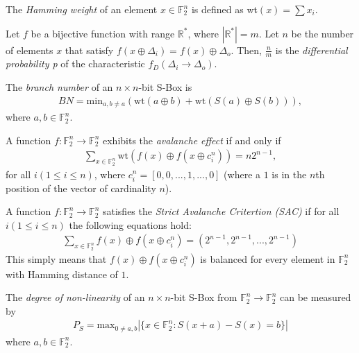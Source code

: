 \documentclass[11pt]{article}
\newcommand{\field}[1]{\mathbb{#1}} %
\begin{document}

\begin{define}
The \emph{Hamming weight} of an element $x \in \field{F}_2^n$ is defined as wt$(x) = \sum x_i$.
\end{define}

\begin{define}
Let $f$ be a bijective function with range $\mathbb{R^*}$, where $|\mathbb{R^*}| = m$. Let $n$ be the number of elements $x$ that satisfy $f(x \oplus \Delta_i) = f(x) \oplus \Delta_o$. Then, $\frac{n}{m}$ is the \emph{differential probability p} of the characteristic $f_D(\Delta_i \to \Delta_o)$.
\end{define}

\begin{define}
The \emph{branch number} of an $n \times n$-bit S-Box is
\begin{eqnarray*}
BN = \text{min}_{a, b\not=a}(\text{wt}(a \oplus b) + \text{wt}(S(a) \oplus S(b))),
\end{eqnarray*}
where $a, b \in \field{F}_2^n$.
\end{define}

\begin{define}
A function $f : \field{F}_2^n \to \field{F}_2^n$ exhibits the \emph{avalanche effect} if and only if 
\begin{eqnarray*}
\sum_{x \in \field{F}_2^n} \text{wt}(f(x) \oplus f(x \oplus c_{i}^{n})) = n2^{n-1},
\end{eqnarray*}
for all $i (1 \leq i \leq n)$, where $c_{i}^{n} = [0, 0, ..., 1, ..., 0]$ (where a $1$ is in the $n$th position of the vector of cardinality $n$).
\end{define}

\begin{define}
A function $f : \field{F}_2^n \to \field{F}_2^n$ satisfies the \emph{Strict Avalanche Critertion (SAC)} if for all $i (1 \leq i \leq n)$ the following equations hold:
\begin{eqnarray*}
\sum_{x \in \field{F}_2^n} f(x) \oplus f(x \oplus c_i^n) = (2^{n-1}, 2^{n-1}, ..., 2^{n-1})
\end{eqnarray*}
This simply means that $f(x) \oplus f(x \oplus c_i^n)$ is balanced for every element in $\field{F}_2^n$ with Hamming distance of $1$. 
\end{define}

\begin{define}
The \emph{degree of non-linearity} of an $n \times n$-bit S-Box from $\field{F}_2^n \to \field{F}_2^n$ can be measured by
\begin{eqnarray*}
	P_S = \text{max}_{0 \not= a, b}|\{x \in \field{F}_2^n : S(x + a) - S(x) = b\}|
\end{eqnarray*}
where $a, b \in \field{F}_2^n$.
\end{define}
\end{document}
